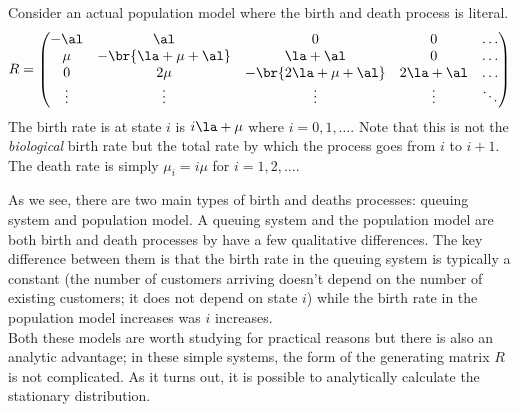 \documentclass{article}
\begin{document}
    \begin{example}
        Consider an actual population model where the birth and death process is literal.
        \[ R = \begin{pmatrix}
            - \al & \al & 0 & 0 & \ldots \\
            \mu & -\br{\la +\mu + \al} & \la+ \al & 0 & \ldots \\
            0 & 2\mu & -\br{2{\la +\mu} + \al} & 2\la +\al & \ldots \\
            \vdots & \vdots & \vdots & \vdots  & \ddots \\
        \end{pmatrix} \]
        The birth rate is at state $i$ is $i \la + \mu$ where $i = 0, 1,\ldots$. Note that this is not the \textit{biological} birth rate but the total rate by which the process goes from $i$ to $i + 1$. The death rate is simply $\mu_i = i \mu$ for $i = 1,2,\ldots$.
    \end{example}
    As we see, there are two main types of birth and deaths processes: queuing system and population model.
    A queuing system and the population model are both birth and death processes by have a few qualitative differences.
    The key difference between them is that the birth rate in the queuing system is typically a constant (the number of customers arriving doesn't depend on the number of existing customers; it does not depend on state $i$) while the birth rate in the population model increases was $i$ increases. \\

    Both these models are worth studying for practical reasons but there is also an analytic advantage; in these simple systems, the form of the generating matrix $R$ is not complicated. As it turns out, it is possible to analytically calculate the stationary distribution.\\
\end{document}
